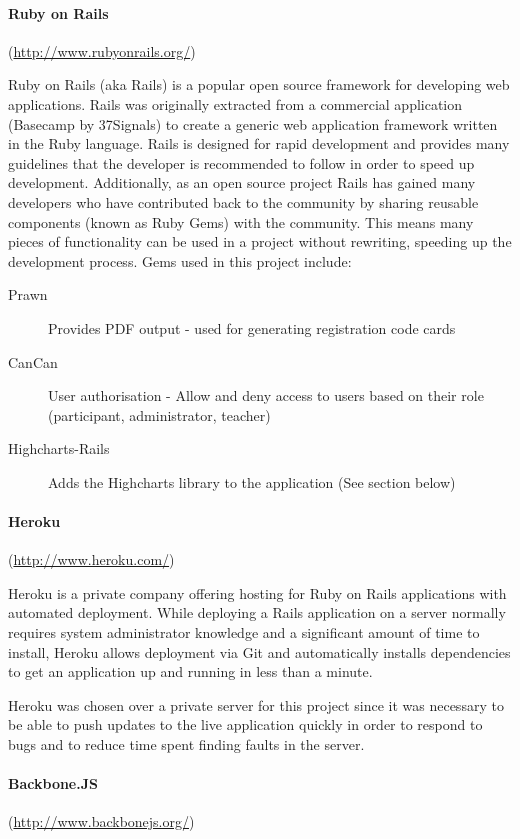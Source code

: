 \paragraph{Ruby on Rails}
(\url{http://www.rubyonrails.org/})

Ruby on Rails (aka Rails) is a popular open source framework for developing web applications\cite{bachle_ruby_2007}.
Rails was originally extracted from a commercial application (Basecamp by 37Signals) to create a generic web
application framework \cite{carneiro_jr._beginning_2010} written in the Ruby language. Rails is designed for
rapid development and provides many guidelines that the developer is recommended to follow in order to speed up
development. Additionally, as an open source project Rails has gained many developers who have contributed back
to the community by sharing reusable components (known as Ruby Gems) with the community. This means many pieces of
functionality can be used in a project without rewriting, speeding up the development process. Gems used in this
project include:
\begin{description}
\item[Prawn] Provides PDF output - used for generating registration code cards
\item[CanCan] User authorisation - Allow and deny access to users based on their role (participant, administrator, teacher)
\item[Highcharts-Rails] Adds the Highcharts library to the application (See section below)
\end{description}

\paragraph{Heroku}
(\url{http://www.heroku.com/})

Heroku is a private company offering hosting for Ruby on Rails applications with automated deployment. While deploying
a Rails application on a server normally requires system administrator knowledge and a significant amount of
time to install, Heroku
allows deployment via Git and automatically installs dependencies to get an application up and running in less
than a minute.

Heroku was chosen over a private server for this project since it was necessary to be able to push updates
to the live application quickly in order to respond to bugs and to reduce time spent finding faults in the server.

\paragraph{Backbone.JS}
(\url{http://www.backbonejs.org/})


